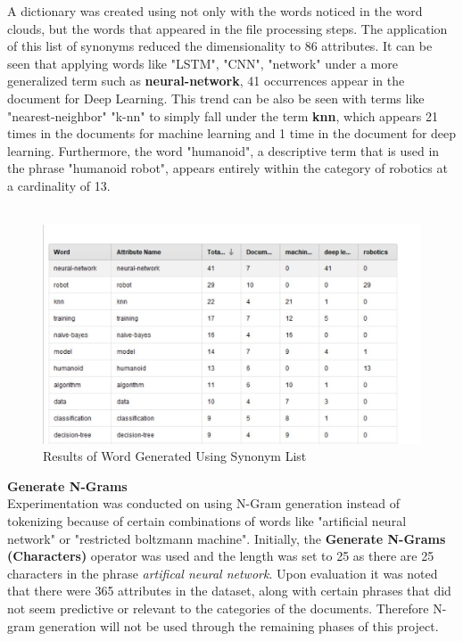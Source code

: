 A dictionary was created using not only with the words noticed in the word clouds, but the words that appeared in the file processing steps. The application of this list of synonyms reduced the dimensionality to 86 attributes. It can be seen that applying words like "LSTM", "CNN", "network" under a more generalized term such as \textbf{neural-network}, 41 occurrences appear in the document for Deep Learning. 
This trend can be also be seen with terms like "nearest-neighbor" "k-nn" to simply fall under the term \textbf{knn}, which appears 21 times in the documents for machine learning and 1 time in the document for deep learning.
Furthermore, the word "humanoid", a descriptive term that is used in the phrase "humanoid robot", appears entirely within the category of robotics at a cardinality of 13. \\ \\
\begin{figure}[ht]
	\begin{center}
		\advance\leftskip-3cm
		\advance\rightskip-3cm
		\includegraphics[keepaspectratio=true,scale=0.8]{__resources/1.JPG}
		\caption{Results of Word Generated Using Synonym List}
		\label{stop}
	\end{center}
\end{figure} 
\newpage 

\textbf{Generate N-Grams}\\
Experimentation was conducted on using N-Gram generation instead of tokenizing because of certain combinations of words like "artificial neural network" or "restricted boltzmann machine". Initially, the \textbf{Generate N-Grams (Characters)} operator was used and the length was set to 25 as there are 25 characters in the phrase \textit{artifical neural network}. Upon evaluation it was noted that there were 365 attributes in the dataset, along with certain phrases that did not seem predictive or relevant to the categories of the documents. Therefore N-gram generation will not be used through the remaining phases of this project.


